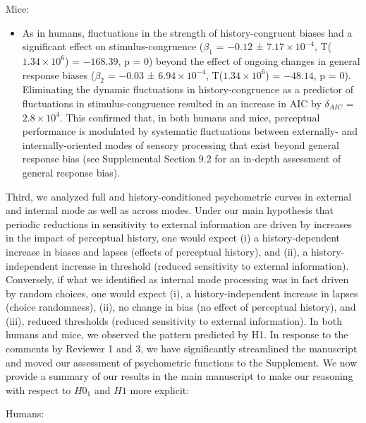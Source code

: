 \documentclass[
]{article}
\providecommand{\tightlist}{%
  \setlength{\itemsep}{0pt}\setlength{\parskip}{0pt}}
\begin{document}
Mice:

\begin{itemize}
\tightlist
\item
  As in humans, fluctuations in the strength of history-congruent biases
  had a significant effect on stimulus-congruence (\(\beta_1\) =
  \(-0.12\) ± \(\ensuremath{7.17\times 10^{-4}}\),
  T(\(\ensuremath{1.34\times 10^{6}}\)) = \(-168.39\), p = \(0\)) beyond
  the effect of ongoing changes in general response biases (\(\beta_2\)
  = \(-0.03\) ± \(\ensuremath{6.94\times 10^{-4}}\),
  T(\(\ensuremath{1.34\times 10^{6}}\)) = \(-48.14\), p = \(0\)).
  Eliminating the dynamic fluctuations in history-congruence as a
  predictor of fluctuations in stimulus-congruence resulted in an
  increase in AIC by \(\delta_{AIC}\) =
  \(\ensuremath{2.8\times 10^{4}}\). This confirmed that, in both humans
  and mice, perceptual performance is modulated by systematic
  fluctuations between externally- and internally-oriented modes of
  sensory processing that exist beyond general response bias (see
  Supplemental Section 9.2 for an in-depth assessment of general
  response bias).
\end{itemize}

Third, we analyzed full and history-conditioned psychometric curves in
external and internal mode as well as across modes. Under our main
hypothesis that periodic reductions in sensitivity to external
information are driven by increases in the impact of perceptual history,
one would expect (i) a history-dependent increase in biases and lapses
(effects of perceptual history), and (ii), a history-independent
increase in threshold (reduced sensitivity to external information).
Conversely, if what we identified as internal mode processing was in
fact driven by random choices, one would expect (i), a
history-independent increase in lapses (choice randomness), (ii), no
change in bias (no effect of perceptual history), and (iii), reduced
thresholds (reduced sensitivity to external information). In both humans
and mice, we observed the pattern predicted by H1. In response to the
comments by Reviewer 1 and 3, we have significantly streamlined the
manuscript and moved our assessment of psychometric functions to the
Supplement. We now provide a summary of our results in the main
manuscript to make our reasoning with respect to \(H0_1\) and \(H1\)
more explicit:

Humans:
\end{document}
